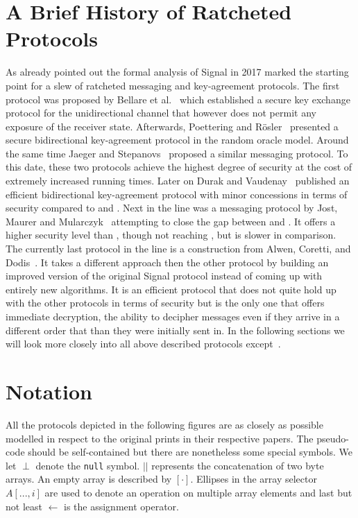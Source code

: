 \documentclass[11pt,a4paper,twoside,openright,bibliography=totoc]{scrbook}
\begin{document}
\section{A Brief History of Ratcheted Protocols}
\label{sec:brief-hist-ratch}

As already pointed out the formal analysis of Signal in 2017 marked the
starting point for a slew of ratcheted messaging and key-agreement
protocols. The first protocol was proposed by Bellare et
al.~\cite{bellare2017ratcheted} which established a secure key
exchange protocol for the unidirectional channel that however does not
permit any exposure of the receiver state. Afterwards, Poettering and
Rösler~\cite{poettering2018towards} presented a secure bidirectional
key-agreement protocol in the random oracle model. Around the same
time Jaeger and Stepanovs~\cite{jaeger2018optimal} proposed a similar
messaging protocol. To this date, these two protocols achieve the
highest degree of security at the cost of extremely increased running
times.  Later on Durak and Vaudenay~\cite{durak2018bidirectional}
published an efficient bidirectional key-agreement protocol with minor
concessions in terms of security compared to
\cite{poettering2018towards} and \cite{jaeger2018optimal}.  Next in
the line was a messaging protocol by Jost, Maurer and
Mularczyk~\cite{jostefficient} attempting to close the gap between
\cite{durak2018bidirectional} and
\cite{poettering2018towards,jaeger2018optimal}. It offers a higher
security level than \cite{durak2018bidirectional}, though not reaching
\cite{poettering2018towards,jaeger2018optimal}, but is slower in
comparison. The currently last protocol in the line is a construction
from Alwen, Coretti, and Dodis~\cite{alwen2018double}. It takes
a different approach then the other protocol by building an
improved version of the original Signal protocol instead of
coming up with entirely new algorithms. It is an efficient protocol
that does not quite hold up with the other protocols in terms of
security but is the only one that offers immediate decryption,
the ability to decipher messages even if they arrive in
a different order that than they were initially sent in.
In the following sections we will look more closely into all
above described protocols except~\cite{bellare2017ratcheted}.

\section{Notation}
\label{sec:notation}

All the protocols depicted in the following figures are as closely
as possible modelled in respect to the original prints in their respective
papers. The pseudo-code should be self-contained but there are nonetheless
some special symbols. We let $\perp$ denote the \texttt{null} symbol.
$||$ represents the concatenation of two byte arrays. An empty
array is described by $[\cdot]$. Ellipses in the array selector
$A[...,i]$ are used to
denote an operation on multiple array elements and last but not least
$\leftarrow$ is the assignment operator.
\end{document}
